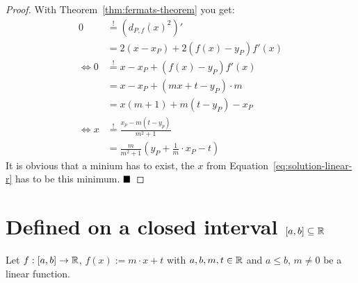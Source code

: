 \begin{proof}
    With Theorem~\ref{thm:fermats-theorem} you get:
    \begin{align}
        0 &\stackrel{!}{=} (d_{P,f}(x)^2)'\\
        &= 2(x-x_P) + 2 (f(x) - y_P)f'(x)\\
        \Leftrightarrow 0 &\stackrel{!}{=} x - x_P + (f(x) - y_P) f'(x)\\
        &= x- x_P + (mx+t - y_P)\cdot m\\
        &= x (m+1) + m(t-y_P) - x_P\\
        \Leftrightarrow x &\stackrel{!}{=} \frac{x_p - m(t-y_p)}{m^2+1}\\
        &= \frac{m}{m^2+1} \left ( y_P + \frac{1}{m} \cdot x_P - t \right )\label{eq:solution-linear-r}
    \end{align}
    It is obvious that a minium has to exist, the $x$ from Equation~\ref{eq:solution-linear-r}
    has to be this minimum. $\qed$
\end{proof}
\clearpage

\section{Defined on a closed interval $[a,b] \subseteq \mathbb{R}$}
Let $f:[a,b] \rightarrow \mathbb{R}$, $f(x) := m\cdot x + t$ with $a,b,m,t \in \mathbb{R}$ and
$a \leq b$, $m \neq 0$  be a linear function.

